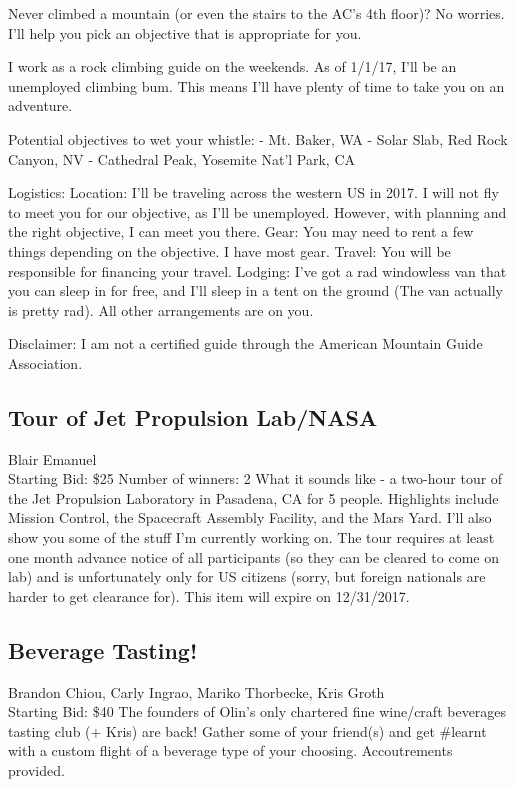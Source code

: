 \documentclass[11pt]{article}
\begin{document}
Never climbed a mountain (or even the stairs to the AC's 4th floor)? No worries. I'll help you pick an objective that is appropriate for you.

I work as a rock climbing guide on the weekends. As of 1/1/17, I'll be an unemployed climbing bum. This means I'll have plenty of time to take you on an adventure.

Potential objectives to wet your whistle:
- Mt. Baker, WA
- Solar Slab, Red Rock Canyon, NV
- Cathedral Peak, Yosemite Nat'l Park, CA

Logistics:
Location: I'll be traveling across the western US in 2017. I will not fly to meet you for our objective, as I'll be unemployed. However, with planning and the right objective, I can meet you there.
Gear: You may need to rent a few things depending on the objective. I have most gear.
Travel: You will be responsible for financing your travel.
Lodging: I've got a rad windowless van that you can sleep in for free, and I'll sleep in a tent on the ground (The van actually is pretty rad). All other arrangements are on you.

Disclaimer: I am not a certified guide through the American Mountain Guide Association.
\subsection{Tour of Jet Propulsion Lab/NASA}
Blair Emanuel
\\
Starting Bid: \$25
\newline
Number of winners: 2
\newline
What it sounds like - a two-hour tour of the Jet Propulsion Laboratory in Pasadena, CA for 5 people. Highlights include Mission Control, the Spacecraft Assembly Facility, and the Mars Yard. I'll also show you some of the stuff I'm currently working on. The tour requires at least one month advance notice of all participants (so they can be cleared to come on lab) and is unfortunately only for US citizens (sorry, but foreign nationals are harder to get clearance for). This item will expire on 12/31/2017.
\subsection{Beverage Tasting!}
Brandon Chiou, Carly Ingrao, Mariko Thorbecke, Kris Groth
\\
Starting Bid: \$40
\newline
The founders of Olin's only chartered fine wine/craft beverages tasting club (+ Kris) are back! Gather some of your friend(s) and get \#learnt with a custom flight of a beverage type of your choosing. Accoutrements provided.
\end{document}
